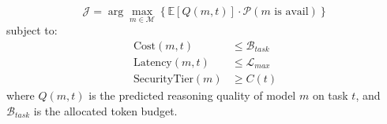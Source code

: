\begin{equation}
\label{eq:optimization}
\mathcal{J} = \arg \max_{m \in \mathcal{M}} \left\{ \mathbb{E}[Q(m, t)] \cdot \mathcal{P}(m \text{ is avail}) \right\}
\end{equation}
subject to:
\begin{align}
\text{Cost}(m, t) &\leq \mathcal{B}_{task} \nonumber \\
\text{Latency}(m, t) &\leq \mathcal{L}_{max} \nonumber \\
\text{SecurityTier}(m) &\geq C(t) \nonumber
\end{align}
where $Q(m, t)$ is the predicted reasoning quality of model $m$ on task $t$, and $\mathcal{B}_{task}$ is the allocated token budget.
